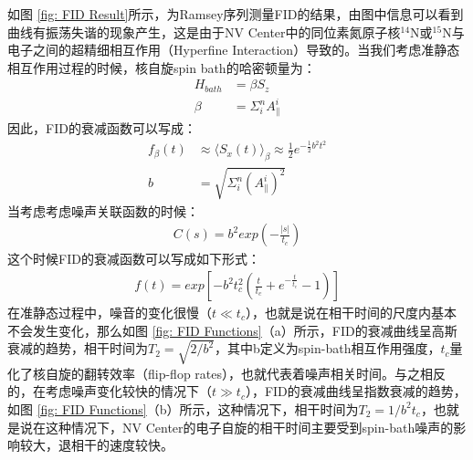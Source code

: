 \documentclass[type = bachelor]{whu-thesis}
\begin{document}
如图 \ref{fig: FID Result}所示，为Ramsey序列测量FID的结果，由图中信息可以看到曲线有振荡失谐的现象产生，这是由于NV Center中的同位素氮原子核$^{14}$N或$^{15}$N与电子之间的超精细相互作用（Hyperfine Interaction）导致的。当我们考虑准静态相互作用过程的时候，核自旋spin bath的哈密顿量为：
\begin{equation}
  \begin{aligned}
    H_{bath} &= \beta S_z \\
    \beta &= \Sigma^n_iA_{\parallel}^i
  \end{aligned}
\end{equation}
因此，FID的衰减函数可以写成：
\begin{equation}
  \begin{aligned}
    f_{\beta}(t) &\approx \langle S_x(t) \rangle_{\beta} \approx \frac{1}{2}e^{-\frac{1}{2}b^2t^2} \\
    b &= \sqrt{\Sigma_i^n(A_{\parallel}^i)^2}
  \end{aligned}
\end{equation}
当考虑考虑噪声关联函数的时候：
\begin{equation}
  \begin{aligned}
    C(s)=b^2exp(-\frac{|s|}{t_c})
  \end{aligned}
\end{equation}
这个时候FID的衰减函数可以写成如下形式：
\begin{equation}
  \begin{aligned}
    f(t)=exp[-b^2t_c^2(\frac{t}{t_c}+e^{-\frac{t}{t_c}}-1)]
  \end{aligned}
\end{equation}
在准静态过程中，噪音的变化很慢（$t\ll t_c$），也就是说在相干时间的尺度内基本不会发生变化，那么如图 \ref{fig: FID Functions}（a）所示，FID的衰减曲线呈高斯衰减的趋势，相干时间为$T_2 = \sqrt{2/b^2}$，其中b定义为spin-bath相互作用强度，$t_c$量化了核自旋的翻转效率（flip-flop rates），也就代表着噪声相关时间。与之相反的，在考虑噪声变化较快的情况下（$t\gg t_c$），FID的衰减曲线呈指数衰减的趋势，如图 \ref{fig: FID Functions}（b）所示，这种情况下，相干时间为$T_2 = 1/b^2t_c$，也就是说在这种情况下，NV Center的电子自旋的相干时间主要受到spin-bath噪声的影响较大，退相干的速度较快。
\end{document}
